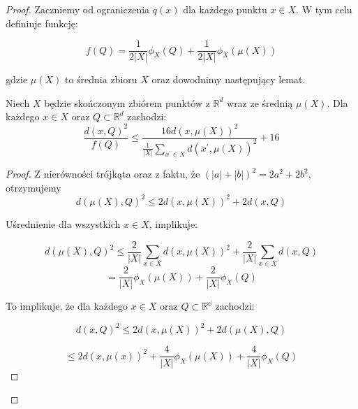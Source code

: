 \begin{proof}

\noindent
Zaczniemy od ograniczenia $q(x)$ dla każdego punktu $x \in X$. 
W tym celu definiuje funkcję:

\begin{equation}
    f(Q) = \frac{1}{2|X|}\phi_{X}(Q) + \frac{1}{2|X|}\phi_{X}(\mu(X))
\end{equation}

\noindent
gdzie $\mu(X)$ to średnia zbioru $X$ oraz dowodnimy następujący lemat. 

\begin{lemma}{\cite{bachem2017scalable}}
    Niech $X$ będzie skończonym zbiórem punktów z $\mathbb{R}^{d}$ wraz ze średnią $\mu(X)$. 
    Dla każdego $x \in X$ oraz $Q \subset \mathbb{R}^{d}$ zachodzi:
    \begin{equation}
        \frac{d(x, Q)^2}{f(Q)} \leq \frac{16d(x, \mu(X))^2}{\frac{1}{|X|}\sum_{x^{'} \in X}d(x^{'}, \mu(X))^2} + 16
    \end{equation}
\end{lemma}

\begin{proof}
    \noindent
    Z nierówności trójkąta oraz z faktu, że $(|a| + |b|)^2 = 2a^2 + 2b^2$, otrzymujemy
    \begin{equation}
        d(\mu(X), Q)^2 \leq 2d(x, \mu(X))^2 + 2d(x, Q)
    \end{equation}
    
    \noindent
    Uśrednienie dla wszystkich $x \in X$, implikuje:

    \begin{equation}
        d(\mu(X), Q)^2 \leq \frac{2}{|X|} \sum_{x \in X} d(x, \mu(X))^2 + \frac{2}{|X|} \sum_{x \in X} d(x, Q)
    \end{equation}
    \begin{equation}
       = \frac{2}{|X|} \phi_{X}(\mu(X))+ \frac{2}{|X|} \phi_{X}(Q)
    \end{equation}

    \noindent
    To implikuje, że dla każdego $x \in X$ oraz $Q \subset \mathbb{R^d}$ zachodzi:

    \begin{equation}
        d(x, Q)^2 \leq 2d(x, \mu(X))^2 + 2d(\mu(X), Q)
    \end{equation}

    \begin{equation}
       \leq 2d(x, \mu(x))^2 +  \frac{4}{|X|} \phi_{X}(\mu(X))+ \frac{4}{|X|} \phi_{X}(Q)
    \end{equation}


\end{proof}
\end{proof}

